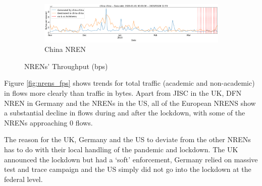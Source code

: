 \documentclass[10pt, journal, letterpaper]{IEEEtran}
\newcommand\linearFigSze{0.48}
\begin{document}
\begin{figure}
    \begin{subfigure}{\linearFigSze\textwidth}
          \centering
          \includegraphics[width=\columnwidth]{img/china_bps.png}
          \caption{China NREN}
          \label{fig:china_bps}
    \end{subfigure}
    \caption{NRENs' Throughput (bps)}
    \label{fig:nrens_bps}
\end{figure}

Figure \ref{fig:nrens_fps} shows trends for total traffic (academic and non-academic) in flows more clearly than traffic in bytes. Apart from JISC in the UK, DFN NREN in Germany and the NRENs in the US, all of the European NRENS show a substantial decline in flows during and after the lockdown, with some of the NRENs approaching 0 flows.

The reason for the UK, Germany and the US to deviate from the other NRENs has to do with their local handling of the pandemic and lockdown. The UK announced the lockdown but had a `soft' enforcement, Germany relied on massive test and trace campaign and the US simply did not go into the lockdown at the federal level.
\end{document}
